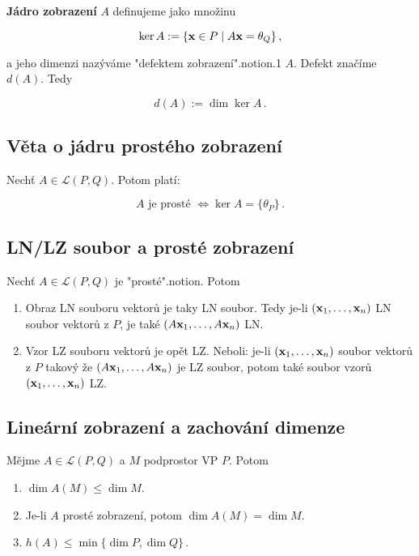\noindent \textbf{Jádro zobrazení} $A$ definujeme jako množinu

\[ \ker A:=\{\mathbf{x}\in P\mid A\mathbf{x}=\theta_Q\}\,, \]

\noindent a jeho dimenzi nazýváme "defektem zobrazení".notion.1 $A$. Defekt značíme $d(A)$. Tedy

\[ d(A):=\dim \ker A\,. \]

\subsection*{Věta o jádru prostého zobrazení}

Nechť $A\in\mathcal L(P,Q)$. Potom platí:

\[ A\text{ je prosté }\Leftrightarrow \ker A=\{\theta_P\}\,. \]

\subsection*{LN/LZ soubor a prosté zobrazení}

Nechť $A\in\mathcal L(P,Q)$ je "prosté".notion. Potom

\begin{enumerate}
    \item Obraz LN souboru vektorů je taky LN soubor. Tedy je-li $(\mathbf{x}_1,\dots,\mathbf{x}_n)$ LN
          soubor vektorů z $P$, je také $(A\mathbf{x}_1,\dots,A\mathbf{x}_n)$ LN.
    \item Vzor LZ souboru vektorů je opět LZ. Neboli: je-li $(\mathbf{x}_1,\dots,\mathbf{x}_n)$ soubor
          vektorů z $P$ takový že $(A\mathbf{x}_1,\dots,A\mathbf{x}_n)$ je LZ soubor, potom také soubor
          vzorů $(\mathbf{x}_1,\dots,\mathbf{x}_n)$ LZ.
\end{enumerate}

\subsection*{Lineární zobrazení a zachování dimenze}

Mějme $A\in \mathcal L(P,Q)$ a $M$ podprostor VP $P$. Potom

\begin{enumerate}
    \item $\dim A(M) \leq \dim M$.
    \item Je-li $A$ prosté zobrazení, potom $\dim A(M) = \dim M$.
    \item $h(A)\leq \min \{\dim P, \dim Q\}\,.$
\end{enumerate}

\pagebreak
